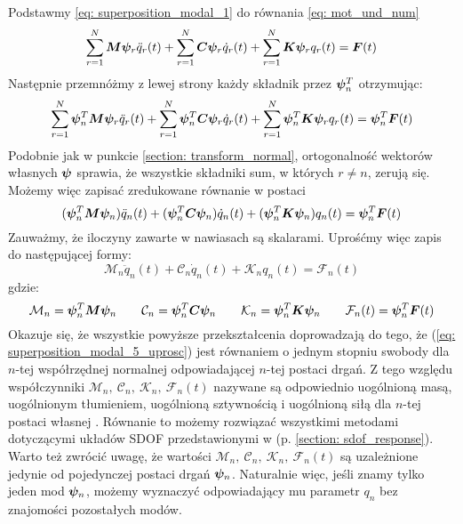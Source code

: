 Podstawmy \ref{eq: superposition_modal_1} do równania \ref{eq: mot_und_num}
\begin{equation} \label{eq: superposition_modal_2_podstaw}
	\sum_{r=1}^{N} \bm{M} \bm{\psi}_r \ddot{q}_r(t) +\sum_{r=1}^{N} \bm{C}\bm{\psi}_r \dot{q}_r(t) + \sum_{r=1}^{N} \bm{K}\bm{\psi}_r q_r(t) = \bm{F}(t)
\end{equation} 
Następnie przemnóżmy z lewej strony każdy składnik przez $\bm{\psi}_n^T$ otrzymując:
\begin{equation} \label{eq: superposition_modal_3_przemnoz}
	\sum_{r=1}^{N} \bm{\psi}_n^T \bm{M} \bm{\psi}_r \ddot{q}_r(t) +\sum_{r=1}^{N} \bm{\psi}_n^T \bm{C}\bm{\psi}_r \dot{q}_r(t) + \sum_{r=1}^{N} \bm{\psi}_n^T \bm{K}\bm{\psi}_r q_r(t) = \bm{\psi}_n^T \bm{F}(t)
\end{equation} 
Podobnie jak w punkcie \ref{section: transform_normal}, ortogonalność wektorów własnych $\bm{\psi}$ sprawia, że wszystkie składniki sum, w których $r\neq n$, zerują się. Możemy więc zapisać zredukowane równanie w postaci
\begin{equation} \label{eq: superposition_modal_4_orto}
	 (\bm{\psi}_n^T \bm{M} \bm{\psi}_n )\ddot{q}_n(t) + (\bm{\psi}_n^T \bm{C}\bm{\psi}_n) \dot{q}_n(t) + (\bm{\psi}_n^T \bm{K}\bm{\psi}_n) q_n(t) = \bm{\psi}_n^T \bm{F}(t)
\end{equation} 
Zauważmy, że iloczyny zawarte w nawiasach są skalarami. Uprośćmy więc zapis do następującej formy:
\begin{equation} \label{eq: superposition_modal_5_uprosc}
	\mathcal{M}_n\ddot{q}_n(t) + \mathcal{C}_n\dot{q}_n(t) + \mathcal{K}_n q_n(t) = \mathcal{F}_n(t)
\end{equation} 
gdzie:
\begin{equation} \label{eq: superposition_modal_6_podstawki}
	\mathcal{M}_n= \bm{\psi}_n^T \bm{M} \bm{\psi}_n \qquad 
	\mathcal{C}_n= \bm{\psi}_n^T \bm{C} \bm{\psi}_n \qquad 
	\mathcal{K}_n= \bm{\psi}_n^T \bm{K} \bm{\psi}_n \qquad
	\mathcal{F}_n(t)= \bm{\psi}_n^T \bm{F}(t)
\end{equation} 
Okazuje się, że wszystkie powyższe przekształcenia doprowadzają do tego, że (\ref{eq: superposition_modal_5_uprosc}) jest równaniem o jednym stopniu swobody dla $n$-tej współrzędnej normalnej odpowiadającej $n$-tej postaci drgań. Z tego względu współczynniki $\mathcal{M}_n,\:\mathcal{C}_n,\:\mathcal{K}_n,\:\mathcal{F}_n(t)$ nazywane są odpowiednio uogólnioną masą, uogólnionym tłumieniem, uogólnioną sztywnością i uogólnioną siłą dla $n$-tej postaci własnej . Równanie to możemy rozwiązać wszystkimi metodami dotyczącymi układów SDOF przedstawionymi w (p. \ref{section: sdof_response}). Warto też zwrócić uwagę, że wartości $\mathcal{M}_n,\:\mathcal{C}_n,\:\mathcal{K}_n,\:\mathcal{F}_n(t)$ są uzależnione jedynie od pojedynczej postaci drgań $\bm{\psi}_n$. Naturalnie więc, jeśli znamy tylko jeden mod $\bm{\psi}_n$, możemy wyznaczyć odpowiadający mu parametr $q_n$ bez znajomości pozostałych modów.
